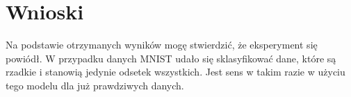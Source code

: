 \section{Wnioski}

Na podstawie otrzymanych wyników mogę stwierdzić, że eksperyment się powiódł. W przypadku danych MNIST udało się sklasyfikować dane, które są rzadkie i stanowią jedynie odsetek wszystkich. Jest sens w takim razie w użyciu tego modelu dla już prawdziwych danych.
